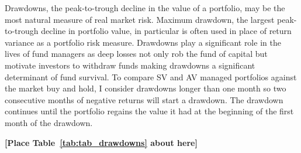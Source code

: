 Drawdowns, the peak-to-trough decline in the value of a portfolio, may be the most natural measure of real market risk. \citep{magdon-ismail_maximum_2006} Maximum drawdown, the largest peak-to-trough decline in portfolio value, in particular is often used in place of return variance as a portfolio risk measure. \citep{johansen_large_2000,articlev1,noauthor_sornette_nodate} Drawdowns play a significant role in the lives of fund managers as deep losses not only rob the fund of capital but motivate investors to withdraw funds making drawdowns a significant determinant of fund survival. \citep{baba_hedge_nodate,papaioannou_procyclical_2013,lang_2006} To compare SV and AV managed portfolios against the market buy and hold, I consider drawdowns longer than one month so two consecutive months of negative returns will start a drawdown. The drawdown continues until the portfolio regains the value it had at the beginning of the first month of the drawdown. 

\bigskip
\centerline{\bf [Place Table~\ref{tab:tab_drawdowns} about here]}
\bigskip

